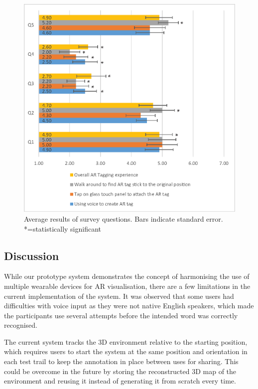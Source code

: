 \begin{figure}[ht]
  \centering
  \includegraphics[width=\linewidth]{images/mgia15/user_study_results2.eps}
  \caption{Average results of survey questions. Bars indicate standard error. *=statistically significant}
	\label{survey_results}
\end{figure}


\subsection{Discussion}

While our prototype system demonstrates the concept of harmonising the use of multiple wearable devices for AR visualisation, there are a few limitations in the current implementation of the system. It was observed that some users had difficulties with voice input as they were not native English speakers, which made the participants use several attempts before the intended word was correctly recognised.  

The current system tracks the 3D environment relative to the starting position, which requires users to start the system at the same position and orientation in each test trail to keep the annotation in place between uses for sharing. This could be overcome in the future by storing the reconstructed 3D map of the environment and reusing it instead of generating it from scratch every time. 

